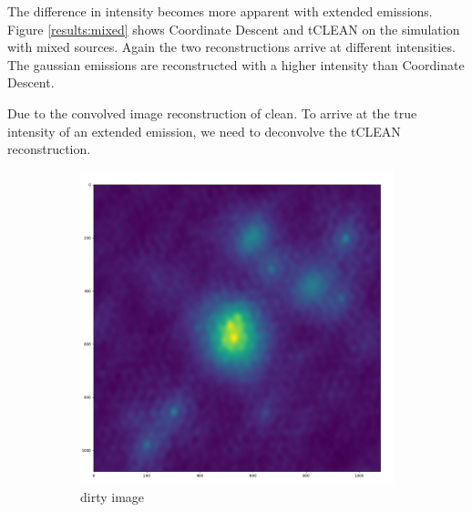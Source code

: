 The difference in intensity becomes more apparent with extended emissions. Figure \ref{results:mixed} shows Coordinate Descent and tCLEAN on the simulation with mixed sources. Again the two reconstructions arrive at different intensities. The gaussian emissions are reconstructed with a higher intensity than Coordinate Descent.

Due to the convolved image reconstruction of clean. To arrive at the true intensity of an extended emission, we need to deconvolve the tCLEAN reconstruction.

\begin{figure}[h]
	\centering
	\begin{subfigure}[b]{0.4\linewidth}
		\includegraphics[width=\linewidth]{./chapters/05.algorithms/results/sim00_mixed_sources_dirty.png}
		\caption{dirty image}
		\label{results:g55:nrao:rec}
	\end{subfigure}
	\begin{subfigure}[b]{0.4\linewidth}

\end{subfigure}
\end{figure}
